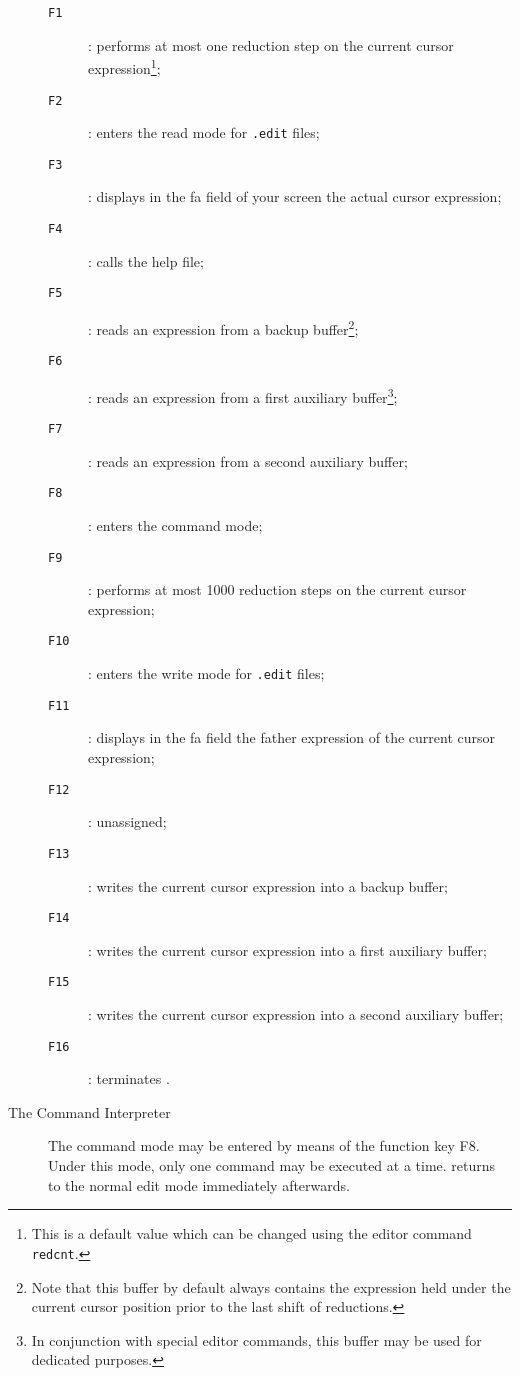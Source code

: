 \begin{description}
\begin{description}
\item[{\tt F1}]: performs at most one reduction step on the current cursor expression\footnote{This is a default value which can be changed using the editor command {\tt redcnt}.};
\item[{\tt F2}]: enters the read mode for {\tt .edit} files; 
\item[{\tt F3}]: displays in the {\sc fa} field of your screen the
actual cursor expression;
\item[{\tt F4}]: calls the \pired help file;
\item[{\tt F5}]: reads an expression from a backup buffer\footnote{Note that this buffer by default always contains the expression held under the
current cursor position prior to the last shift of reductions.};
\item[{\tt F6}]: reads an expression from a first auxiliary buffer\footnote{In conjunction with special editor commands, this buffer may
be used for dedicated purposes.};
\item[{\tt F7}]: reads an expression from a second auxiliary buffer;
\item[{\tt F8}]: enters the command mode;
\item[{\tt F9}]: performs at most 1000 reduction steps on the current 
cursor expression;
\item[{\tt F10}]: enters the write mode for {\tt .edit} files; 
\item[{\tt F11}]: displays in the {\sc fa} field the father expression of the current cursor expression; 
\item[{\tt F12}]: unassigned;
%
\addtocounter{footnote}{-3}
%
\item[{\tt F13}]: writes the current cursor expression into a backup
buffer\footnotemark;
\item[{\tt F14}]: writes the current cursor expression into a first auxiliary buffer;
\item[{\tt F15}]: writes the current cursor expression into a second auxiliary buffer;
\item[{\tt F16}]: terminates \pired.
\end{description}


\item[The Command Interpreter] $\;$\\
The command mode may be entered by means of the function key F8. 
Under this mode, only one command may be executed at a time. \pired
returns to the normal edit mode immediately afterwards.


\end{description}
